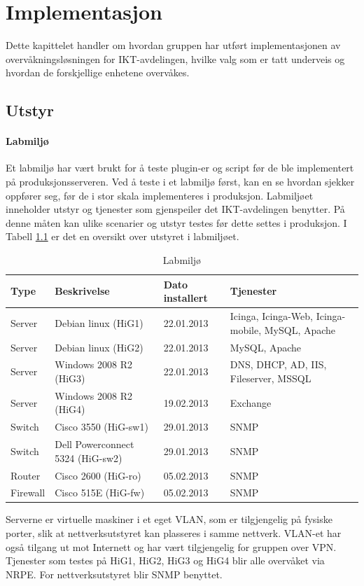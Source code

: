 \chapter{Implementasjon}
Dette kapittelet handler om hvordan gruppen har utført implementasjonen av overvåkningsløsningen for IKT-avdelingen, hvilke valg som er tatt underveis og hvordan de forskjellige enhetene overvåkes.
\clearpage
\section{Utstyr}
\subsubsection{Labmiljø}
Et labmiljø har vært brukt for å teste plugin-er og script før de ble implementert på produksjonsserveren. Ved å teste i et labmiljø først, kan en se hvordan sjekker oppfører seg, før de i stor skala implementeres i produksjon. Labmiljøet inneholder utstyr og tjenester som gjenspeiler det IKT-avdelingen benytter. På denne måten kan ulike scenarier og utstyr testes før dette settes i produksjon. I Tabell \ref{labmiljo} er det en oversikt over utstyret i labmiljøet.
\begin{changemargin}{-1cm}{-1cm}
\begin{table}[H]
\begin{center}
\begin{tabular}{ | l | l | l | p{4cm} |} \hline
	\textbf{Type} & \textbf{Beskrivelse} & \textbf{Dato installert} & \textbf{Tjenester} \\ \hline
	Server & Debian linux (HiG1) & 22.01.2013 & Icinga, Icinga-Web, Icinga-mobile, MySQL, Apache \\ \hline
	Server & Debian linux (HiG2) & 22.01.2013 &	MySQL, Apache \\ \hline
	Server & Windows 2008 R2 (HiG3) & 22.01.2013 & DNS, DHCP, AD, IIS, Fileserver, MSSQL \\ \hline
	Server & Windows 2008 R2 (HiG4) & 19.02.2013 & Exchange \\ \hline 
	Switch & Cisco 3550 (HiG-sw1) &	29.01.2013 & SNMP \\ \hline
	Switch & Dell Powerconnect 5324 (HiG-sw2) & 29.01.2013 & SNMP \\ \hline
	Router & Cisco 2600 (HiG-ro) & 05.02.2013 & SNMP \\ \hline 
	Firewall & Cisco 515E (HiG-fw) & 05.02.2013 & SNMP \\ \hline
\end{tabular}
\caption{Labmiljø}
\label{labmiljo}
\end{center}
\end{table}
\end{changemargin}
Serverne er virtuelle maskiner i et eget VLAN, som er tilgjengelig på fysiske porter, slik at nettverksutstyret kan plasseres i samme nettverk. VLAN-et har også tilgang ut mot Internett og har vært tilgjengelig for gruppen over VPN. Tjenester som testes på HiG1, HiG2, HiG3 og HiG4 blir alle overvåket via NRPE. For nettverksutstyret blir SNMP benyttet.

